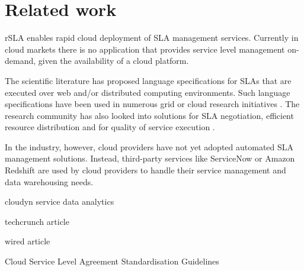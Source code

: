 \section{Related work}
rSLA enables rapid cloud deployment of SLA management services. Currently in cloud markets there is no application that provides service level management on-demand, given the availability of a cloud platform.

The scientific literature has proposed language specifications \cite{wsla, wsag} for SLAs that are executed over web and/or distributed computing environments. Such language specifications have been used in numerous grid or cloud research initiatives \cite{soi, butler, cslam}. The research community has also looked into solutions for SLA negotiation, efficient resource distribution and for quality of service execution  \cite{SNAP, lessons}.

In the industry, however, cloud providers have not yet adopted automated SLA management solutions. Instead, third-party services like ServiceNow \cite{servicenow} or Amazon Redshift \cite{redshift} are used by cloud providers to handle their service management and data warehousing needs.

cloudyn service data analytics

techcrunch article

wired article

Cloud Service Level Agreement Standardisation Guidelines